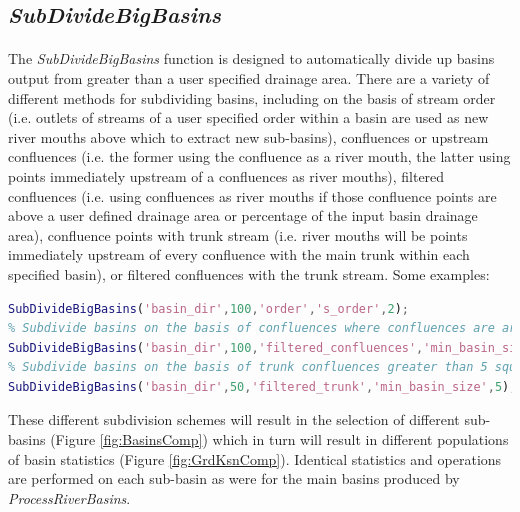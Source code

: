 \subsection{\textit{SubDivideBigBasins}} \label{sec:SbDvdBsn}
\paragraph{}The \textit{SubDivideBigBasins} function is designed to automatically divide up basins output from  greater than a user specified drainage area. There are a variety of different methods for subdividing basins, including on the basis of stream order (i.e. outlets of streams of a user specified order within a basin are used as new river mouths above which to extract new sub-basins), confluences or upstream confluences (i.e. the former using the confluence as a river mouth, the latter using points immediately upstream of a confluences as river mouths), filtered confluences (i.e. using confluences as river mouths if those confluence points are above a user defined drainage area or percentage of the input basin drainage area), confluence points with trunk stream (i.e. river mouths will be points immediately upstream of every confluence with the main trunk within each specified basin), or filtered confluences with the trunk stream. Some examples:

\begin{lstlisting}[language=Matlab]
% Subdivide basins stored in the 'basin_dir' folder that are greater than 100 square kilometers in drainage  on the basis of stream order with outlets of second order streams serving as river mouths
SubDivideBigBasins('basin_dir',100,'order','s_order',2);
% Subdivide basins on the basis of confluences where confluences are areas with draiange areas greater than 5 square kilometers in drainage area
SubDivideBigBasins('basin_dir',100,'filtered_confluences','min_basin_size',5);
% Subdivide basins on the basis of trunk confluences greater than 5 square kilometers for any main basin greater than 50 square kilometers
SubDivideBigBasins('basin_dir',50,'filtered_trunk','min_basin_size',5);
\end{lstlisting}

\noindent
These different subdivision schemes will result in the selection of different sub-basins (Figure \ref{fig:BasinsComp}) which in turn will result in different populations of basin statistics (Figure \ref{fig:GrdKsnComp}). Identical statistics and operations are performed on each sub-basin as were for the main basins produced by \textit{ProcessRiverBasins}.

